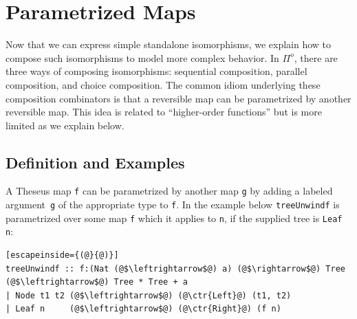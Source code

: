 \documentclass{article}
\newcommand{\ctr}[1]{{\scriptsize{\texttt{#1}}}}
\begin{document}
\section{Parametrized Maps}
\label{theseusII}

Now that we can express simple standalone isomorphisms, we explain how to
compose such isomorphisms to model more complex behavior. In \ensuremath{\Pi^{o}}, there
are three ways of composing isomorphisms: sequential composition, parallel
composition, and choice composition. The common idiom underlying these
composition combinators is that a reversible map can be parametrized by
another reversible map. This idea is related to ``higher-order functions''
but is more limited as we explain below.

\subsection{Definition and Examples}

A Theseus map \ctr{f} can be parametrized by another map \ctr{g} by adding a
labeled argument~\ctr{g} of the appropriate type to \ctr{f}. In the example
below \ctr{treeUnwindf} is parametrized over some map \ctr{f} which it
applies to \ctr{n}, if the supplied tree is \lstinline{Leaf n}:
\begin{lstlisting}[escapeinside={(@}{@)}]
treeUnwindf :: f:(Nat (@$\leftrightarrow$@) a) (@$\rightarrow$@) Tree (@$\leftrightarrow$@) Tree * Tree + a
| Node t1 t2 (@$\leftrightarrow$@) (@\ctr{Left}@) (t1, t2)
| Leaf n     (@$\leftrightarrow$@) (@\ctr{Right}@) (f n)
 \end{lstlisting}
\end{document}
